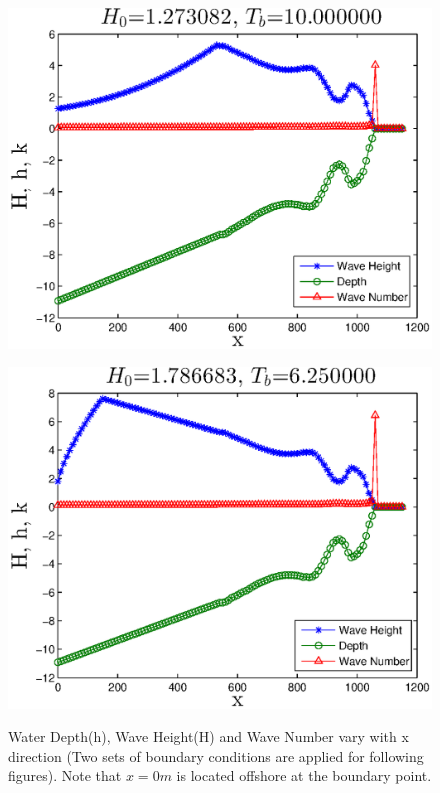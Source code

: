 \begin{figure}[h]
\begin{minipage}[b]{0.47\linewidth}
\centering
\includegraphics[width=\textwidth]{forward_plot/p1_1.eps}
\label{FigHhk_1}
\end{minipage}
\hspace{0.2cm}
\begin{minipage}[b]{0.47\linewidth}
\centering
\includegraphics[width=\textwidth]{forward_plot/p2_1.eps}
\label{FigHhk_2}
\end{minipage}
\caption{Water Depth(h), Wave Height(H) and Wave Number vary with x direction (Two sets of boundary conditions are applied for following figures). Note that $x=0 m$ is located offshore at the boundary point.}
\end{figure}


